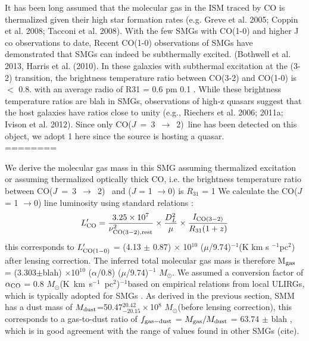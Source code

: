\documentclass{emulateapj}
\newcommand{\Msun}{\mbox{$M_{\odot}$}}
\newcommand{\rarr}{$\rightarrow$}
\newcommand{\CO}{\mbox{CO($J$ = 3 $\rightarrow$ 2) }}
\newcommand{\LpU}{\mbox{K km s$^{-1}$ pc$^2$}}
\newcommand{\eg}{{\sl e.g.,~}}
\newcommand{\pmOne}{$^{-1}$}
\begin{document}
It has been long assumed that the molecular gas in the ISM traced by CO is thermalized given their high star formation rates (e.g. Greve et al. 2005; Coppin et al. 2008; Tacconi et al. 2008). With the few SMGs with CO(1-0) and higher J co observations to date,
Recent CO(1-0) observations of SMGs have demonstrated that SMGs can indeed be subthermally excited. (Bothwell et al. 2013, Harris et al. (2010). In these galaxies with subthermal excitation at the (3-2) transition, the brightness temperature ratio between CO(3-2) and CO(1-0) is $<$ 0.8. with an average radio of R31 = 0.6 pm 0.1 \citep[\eg][]{Harris10a,Carilli10a,Swinbank2010a,Ivison11a,Ivison10d}. While these brightness temperature ratios are blah in SMGs, observations of high-z quasars suggest that the host galaxies have ratios close to unity (e.g., Riechers 
et al. 2006; 2011a; Ivison et al. 2012). Since only \CO line has been detected on this object, we adopt 1 here since the source is hosting a quasar.
\\ ======== 


We derive the molecular gas mass in
this SMG assuming thermalized excitation or assuming thermalized optically thick CO, i.e. the brightness temperature ratio 
between \CO
and ($J$ = 1 \rarr 0) is $R_{31}$ = 1 \citep[\eg][and references therein]{Riechers11a,Scott11a}
We calculate the CO($J$ = 1 \rarr 0) line luminosity using standard relations 
\citep[\eg][]{Solomon05a,Carilli13a}:
\begin{equation}
L^{\prime}_{\rm CO} = \frac{3.25\times10^7}{\nu_{\rm CO (3-2), rest}^2}\times \frac{D_L^2}{\mu} \times
\frac{I_{\rm CO(3-2)}} {R_{\rm 31} (1 + z)}
\end{equation}
this corresponds to $L^{\prime}_{\rm CO (1-0)}$ = (4.13 $\pm$ 0.87) $\times$ 10$^{10}$ ($\mu$/9.74)\pmOne (\rm K km s
\pmOne pc$^2$)
after lensing correction. The inferred total molecular gas mass is therefore M$_{\rm gas}$ = (3.303$\pm$blah) $\times
$10$^{10}$ ($\alpha$/0.8) ($\mu$/9.74)$^{-1}$ \Msun. We assumed a conversion factor of $\alpha_{\rm CO}$ =
0.8 \Msun (\LpU)\pmOne based on empirical relations from local ULIRGs, which is typically
adopted for SMGs \citep{Bothwell13a,Tacconi10a,Daddi2010a}. As derived in the previous section, SMM has a dust mass of $M_{\rm dust}
$=50.47$^{20.42}_{-20.15}\times$10$^8$ \Msun (before lensing correction), this corresponds to a gas-to-dust
ratio of $f_{\rm gas-dust}$ = $M_{\rm gas}/M_{\rm dust}$ = 63.74 $\pm$ blah , which is in good agreement with the range 
of values found in other SMGs (cite).
\end{document}
